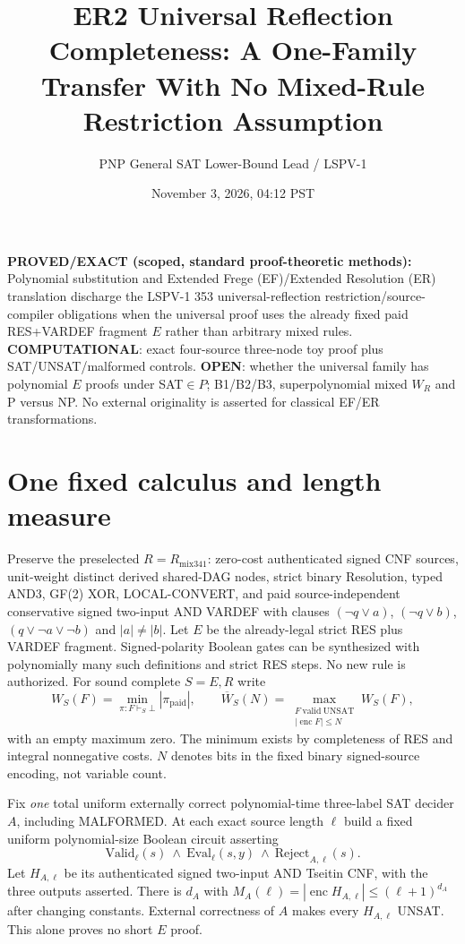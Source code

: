 \documentclass[11pt]{article}
\title{ER2 Universal Reflection Completeness: A One-Family Transfer With No Mixed-Rule Restriction Assumption}
\author{PNP General SAT Lower-Bound Lead / LSPV-1}
\date{November 3, 2026, 04:12 PST}
\begin{document}
\maketitle
\noindent\textbf{PROVED/EXACT (scoped, standard proof-theoretic methods):} Polynomial substitution and Extended Frege (EF)/Extended Resolution (ER) translation discharge the LSPV-1 353 universal-reflection restriction/source-compiler obligations when the universal proof uses the already fixed paid RES+VARDEF fragment $E$ rather than arbitrary mixed rules. \textbf{COMPUTATIONAL}: exact four-source three-node toy proof plus SAT/UNSAT/malformed controls. \textbf{OPEN}: whether the universal family has polynomial $E$ proofs under SAT$\in P$; B1/B2/B3, superpolynomial mixed $W_R$ and P versus NP. No external originality is asserted for classical EF/ER transformations.

\section*{One fixed calculus and length measure}
Preserve the preselected $R=R_{\mathrm{mix341}}$: zero-cost authenticated signed CNF sources, unit-weight distinct derived shared-DAG nodes, strict binary Resolution, typed AND3, GF(2) XOR, LOCAL-CONVERT, and paid source-independent conservative signed two-input AND VARDEF with clauses $(\neg q\vee a)$, $(\neg q\vee b)$, $(q\vee\neg a\vee\neg b)$ and $|a|\ne|b|$. Let $E$ be the already-legal strict RES plus VARDEF fragment. Signed-polarity Boolean gates can be synthesized with polynomially many such definitions and strict RES steps. No new rule is authorized. For sound complete $S=E,R$ write
\[
W_S(F)=\min_{\pi:F\vdash_S\bot}|\pi_{\mathrm{paid}}|,\qquad
\overline W_S(N)=\max_{\substack{F\ \mathrm{valid\ UNSAT}\\|\operatorname{enc}F|\le N}} W_S(F),
\]
with an empty maximum zero. The minimum exists by completeness of RES and integral nonnegative costs. $N$ denotes bits in the fixed binary signed-source encoding, not variable count.

Fix \emph{one} total uniform externally correct polynomial-time three-label SAT decider $A$, including MALFORMED. At each exact source length $\ell$ build a fixed uniform polynomial-size Boolean circuit asserting
\[
\mathrm{Valid}_\ell(s)\ \land\ \mathrm{Eval}_\ell(s,y)\
\land\ \mathrm{Reject}_{A,\ell}(s).
\]
Let $H_{A,\ell}$ be its authenticated signed two-input AND Tseitin CNF, with the three outputs asserted. There is $d_A$ with $M_A(\ell)=|\operatorname{enc}H_{A,\ell}|\le(\ell+1)^{d_A}$ after changing constants. External correctness of $A$ makes every $H_{A,\ell}$ UNSAT. This alone proves no short $E$ proof.
\end{document}
